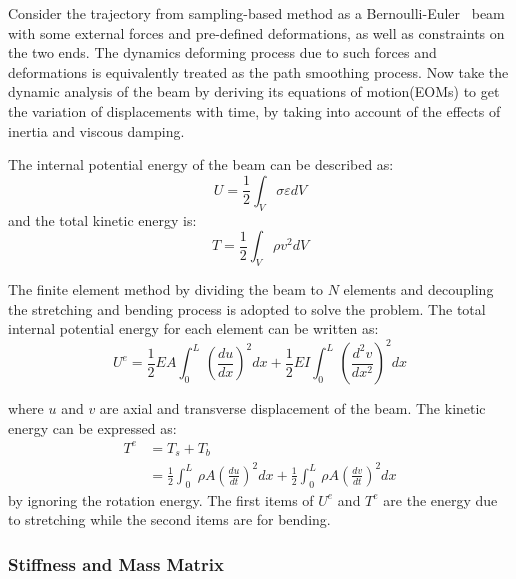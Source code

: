 \documentclass[conference, onecolumn]{IEEEtran}
\begin{document}
Consider the trajectory from sampling-based method as a Bernoulli-Euler~\cite{Truesdell1984} beam with some external forces and pre-defined deformations, as well as constraints on the two ends. The dynamics deforming process due to such forces and deformations is equivalently treated as the path smoothing process. Now take the dynamic analysis of the beam by deriving its equations of motion(EOMs) to get the variation of displacements with time, by taking into account of the effects of inertia and viscous damping.

The internal potential energy of the beam can be described as:
\begin{equation}
    {U} = \frac{1}{2}\int_V \sigma\varepsilon  dV
	\label{potentialenergy}
\end{equation}
and the total kinetic energy is:
\begin{equation}
    {T} = \frac{1}{2}\int_V \rho v^2  dV
	\label{kineticenergy}
\end{equation}

 The finite element method by dividing the beam to $N$ elements and decoupling the stretching and bending process is adopted to solve the problem. The total internal potential energy for each element can be written as:
\begin{equation}
    {U^e} = \frac{1}{2}EA\int_{0}^{L}  \,\left(\frac{du}{dx}\right)^2dx + \frac{1}{2}EI\int_{0}^{L}  \,\left(\frac{d^2v}{dx^2}\right)^2dx
	\label{elementpotentialenergy}
\end{equation}

where $u$ and $v$ are axial and transverse displacement of the beam.
The kinetic energy can be expressed as:
\begin{equation}
	\begin{split}
    {T^e} & = {T_s} + {T_b} \\%
	& = \frac{1}{2}\int_{0}^{L}  \,\rho A\left(\frac{du}{dt}\right)^2dx + \frac{1}{2}\int_{0}^{L}  \,\rho A\left(\frac{dv}{dt}\right)^2dx
	\end{split}
	\label{elementkineticenergy}
\end{equation}
by ignoring the rotation energy. The first items of $U^e$ and $T^e$ are the energy due to stretching while the second items are for bending.



\subsubsection{Stiffness and Mass Matrix}
\end{document}
